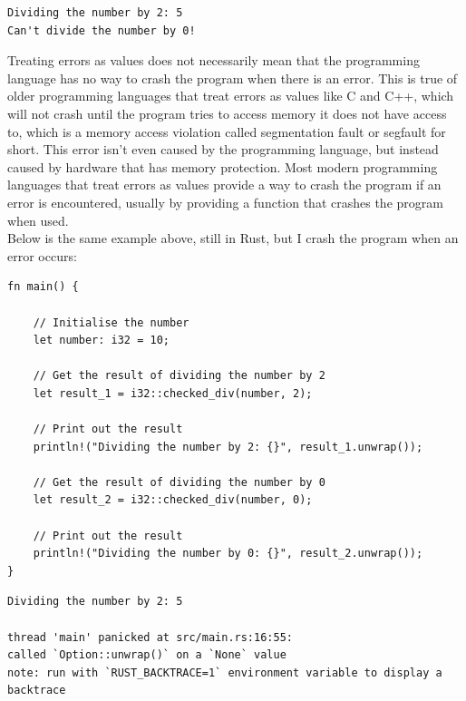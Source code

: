 \documentclass[11pt]{article}
\begin{document}
\begin{verbatim}
Dividing the number by 2: 5
Can't divide the number by 0!
\end{verbatim}

 \newpage

Treating errors as values does not necessarily mean that
the programming language has no way to crash the program
when there is an error. This is true of older
programming languages that treat errors as values like C and C++,
which will not crash until the program tries to access memory
it does not have access to, which is a memory access violation
called segmentation fault or segfault for short.
This error isn’t even caused by the programming language,
but instead caused by hardware that has memory protection.
Most modern programming languages that treat errors as values
provide a way to crash the program if an error is encountered,
usually by providing a function that crashes the program when used.  \\

Below is the same example above, still in Rust,
but I crash the program when an error occurs:
\begin{verbatim}
fn main() {

    // Initialise the number
    let number: i32 = 10;

    // Get the result of dividing the number by 2
    let result_1 = i32::checked_div(number, 2);

    // Print out the result
    println!("Dividing the number by 2: {}", result_1.unwrap());

    // Get the result of dividing the number by 0
    let result_2 = i32::checked_div(number, 0);

    // Print out the result
    println!("Dividing the number by 0: {}", result_2.unwrap());
}
\end{verbatim}

\begin{verbatim}
Dividing the number by 2: 5

thread 'main' panicked at src/main.rs:16:55:
called `Option::unwrap()` on a `None` value
note: run with `RUST_BACKTRACE=1` environment variable to display a backtrace
\end{verbatim}
\end{document}
